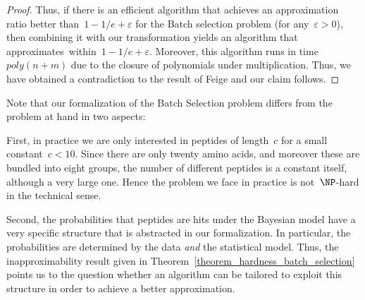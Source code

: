 \begin{proof}
Thus, if there is an efficient algorithm that achieves an approximation ratio better than~$1 - 1/e + \varepsilon$ for the Batch selection problem (for any~$\varepsilon > 0$), then combining it with our transformation yields an algorithm that approximates~\maxkcover within~$1 - 1/e + \varepsilon$.
%
Moreover, this algorithm runs in time~$poly(n + m)$ due to the closure of polynomials under multiplication.
%
Thus, we have obtained a contradiction to the result of Feige and our claim follows.
\end{proof}
%
\begin{remark}
Note that our formalization of the Batch Selection problem differs from the problem at hand in two aspects:

First, in practice we are only interested in peptides of length~$c$ for a small constant~$c < 10$. Since there are only twenty amino acids, and moreover these are bundled into eight groups, the number of different peptides is a constant itself, although a very large one. Hence the problem we face in practice is not~$\NP$-hard in the   technical sense.

Second, the probabilities that peptides are hits under the Bayesian model have a very specific structure that is abstracted in our formalization. In particular, the probabilities are determined by the data \emph{and} the statistical model. 
%
Thus, the inapproximability result given in Theorem~\ref{theorem_hardness_batch_selection} points us to the question whether an algorithm can be tailored to exploit this structure in order to achieve a better approximation.
\end{remark}


